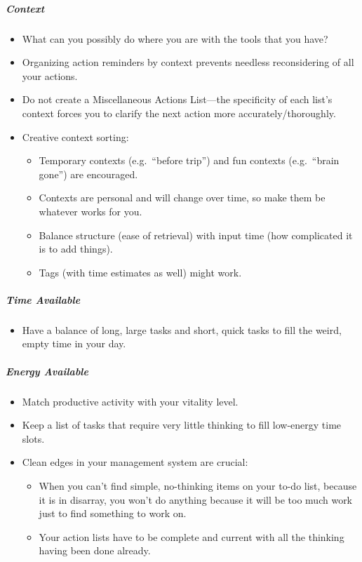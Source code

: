 \documentclass{article}
\begin{document}
\subparagraph{Context}

\begin{itemize}
  \item What can you possibly do where you are with the tools that you have?
  \item Organizing action reminders by context prevents needless reconsidering of all your actions.
  \item Do not create a Miscellaneous Actions List---the specificity of each list's context forces you to clarify the next action more accurately/thoroughly.
  \item Creative context sorting:
  \begin{itemize}
    \item Temporary contexts (e.g.\ ``before trip'') and fun contexts (e.g.\ ``brain gone'') are encouraged.
    \item Contexts are personal and will change over time, so make them be whatever works for you.
    \item Balance structure (ease of retrieval) with input time (how complicated it is to add things).
    \item Tags (with time estimates as well) might work.
  \end{itemize}
\end{itemize}

\subparagraph{Time Available}

\begin{itemize}
  \item Have a balance of long, large tasks and short, quick tasks to fill the weird, empty time in your day.
\end{itemize}

\subparagraph{Energy Available}

\begin{itemize}
 \item Match productive activity with your vitality level.
 \item Keep a list of tasks that require very little thinking to fill low-energy time slots.
 \item Clean edges in your management system are crucial:
 \begin{itemize}
  \item When you can't find simple, no-thinking items on your to-do list, because it is in disarray, you won't do anything because it will be too much work just to find something to work on.
  \item Your action lists have to be complete and current with all the thinking having been done already.
 \end{itemize}
\end{itemize}
\end{document}
